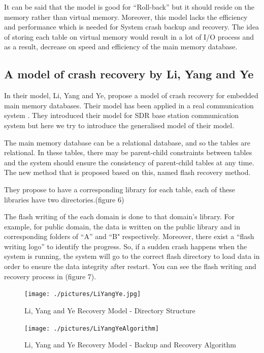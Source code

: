 \documentclass[12pt]{article} %
\begin{document}
It can be said that the model is good for ``Roll-back'' but it should reside on the memory rather than virtual memory. Moreover, this model lacks the efficiency and performance which is needed for System crash backup and recovery. The idea of storing each table on virtual memory would result in a lot of I/O process and as a result, decrease on speed and efficiency of the main memory database.

\subsection{A model of crash recovery by Li, Yang and Ye}

In their model, Li, Yang and Ye, propose a model of crash recovery for embedded main memory databases.  Their model has been applied in a real communication system \cite{lirecovery}. They introduced their model for SDR base station communication system but here we try to introduce the generalised model of their model.

The main memory database can be a relational database, and so the tables are relational. In these tables, there may be parent-child constraints between tables and the system should ensure the consistency of parent-child tables at any time. The new method that is proposed based on this, named flash recovery method.

They propose to have a corresponding library for each table, each of these libraries have two directories.(figure 6)

The flash writing of the each domain is done to that domain's library. For example, for  public domain, the data is written on the public library and in corresponding folders of ``A'' and ``B" respectively. Moreover, there exist a “flash writing logo” to identify the progress. So, if a sudden crash happens when the system is running, the system will go to the correct flash directory to load data in order to ensure the data integrity after restart. You can see the flash writing and recovery process in (figure 7).
\begin{figure}
\centering
\texttt{[image: ./pictures/LiYangYe.jpg]}
\caption{Li, Yang and Ye Recovery Model - Directory Structure}
\label{fig:LiYangYe}
\end{figure}

\begin{figure}
\centering
\texttt{[image: ./pictures/LiYangYeAlgorithm]}
\caption{Li, Yang and Ye Recovery Model - Backup and Recovery Algorithm}
\label{fig:LiYangYeAlgorithm}
\end{figure}
\end{document}
